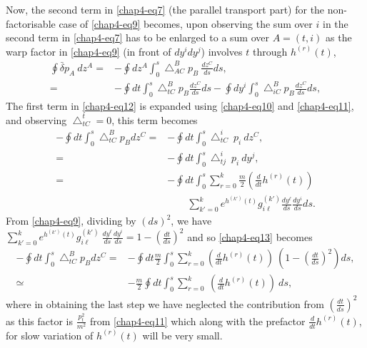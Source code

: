 Now, the second term in \eqref{chap4-eq7} (the parallel transport part) for the non-factorisable case of \eqref{chap4-eq9} becomes, upon  observing the sum over $i$ in the second term in \eqref{chap4-eq7} has to be enlarged to a sum over $A=(t,i)$ as the warp  factor in \eqref{chap4-eq9} (in front of $dy^idy^j$) involves $t$ through $h^{(r)}(t)$,  
\begin{align}
\oint {\bar{\delta}}p_A\ dz^A= &-\oint dz^A\int_0^s{\bigtriangleup}^B_{AC}p_B\ \frac{dz^C}{ds} ds, \nonumber \\
= &-\oint dt\int_0^s{\bigtriangleup}^B_{tC}p_B\frac{dz^C}{ds}ds-\oint dy^i\int_0^s{\bigtriangleup}^B_{iC}p_B
\frac{dz^C}{ds}ds,\label{chap4-eq12}
\end{align}
The first term in \eqref{chap4-eq12} is expanded using \eqref{chap4-eq10} and \eqref{chap4-eq11}, and observing ${\bigtriangleup}^t_{tC}=0$, this term becomes 
\begin{align}
-\oint dt\int_0^s{\bigtriangleup}^B_{tC}p_B dz^C= &-\oint dt\int_0^s {\bigtriangleup}^i_{tC}\ p_i\ dz^C, \nonumber \\
= &-\oint dt\int_0^s {\bigtriangleup}^i_{tj}\ p_i\ dy^j, \nonumber \\
= &-\oint dt\int_0^s\sum_{r=0}^k\frac{m}{2}\left(\frac{d}{dt}h^{(r)}(t)\right) \nonumber \\
& \qquad \sum_{k'=0}^ke^{h^{(k')}(t)}g_{i\ell}^{(k')} \frac{dy^{\ell}}{ds}\frac{dy^i}{ds}ds. \label{chap4-eq13}
\end{align}
From \eqref{chap4-eq9}, dividing by $(ds)^2$, we have $ {\sum}_{k'=0}^ke^{h^{(k')}(t)}g_{i\ell}^{(k')}\ 
\frac{dy^{\ell}}{ds}\frac{dy^i}{ds}=1-\left(\frac{dt}{ds}\right)^2$ and so \eqref{chap4-eq13} becomes 
\begin{align}
-\oint dt\int_0^s{\bigtriangleup}^B_{tC}p_Bdz^C= &-\oint dt\frac{m}{2}\int_0^s \sum_{r=0}^k \left(\frac{d}{dt}
h^{(r)}(t)\right)\ \left(1-\left(\frac{dt}{ds}\right)^2\right) ds, \nonumber \\
\simeq & -\frac{m}{2}\oint dt \int_0^s\sum_{r=0}^k\ \left(\frac{d}{dt}h^{(r)}(t)\right)\ ds,\label{chap4-eq14}
\end{align}
where in obtaining the last step we have neglected the contribution from $\left(\frac{dt}{ds}\right)^2$ as this 
factor is $\frac{p_t^2}{m^2}$ from \eqref{chap4-eq11} which along with the prefactor $\frac{d}{dt}h^{(r)}(t)$, for slow 
variation of $h^{(r)}(t)$ will be very small. 

